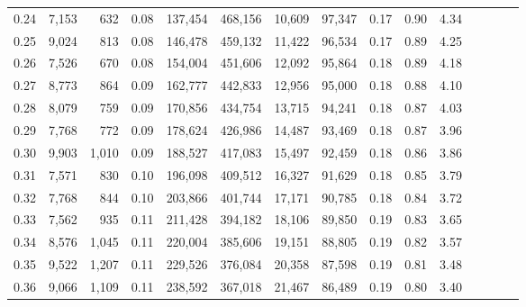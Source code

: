 \begin{tabular}{rrrcrrrrrrrrrrr}
0.24 &   7,153 &    632 &                                       0.08 &  137,454 &  468,156 &   10,609 &   97,347 &  0.17 &  0.90 &                         4.34 \\
0.25 &   9,024 &    813 &                                       0.08 &  146,478 &  459,132 &   11,422 &   96,534 &  0.17 &  0.89 &                         4.25 \\
0.26 &   7,526 &    670 &                                       0.08 &  154,004 &  451,606 &   12,092 &   95,864 &  0.18 &  0.89 &                         4.18 \\
0.27 &   8,773 &    864 &                                       0.09 &  162,777 &  442,833 &   12,956 &   95,000 &  0.18 &  0.88 &                         4.10 \\
0.28 &   8,079 &    759 &                                       0.09 &  170,856 &  434,754 &   13,715 &   94,241 &  0.18 &  0.87 &                         4.03 \\
0.29 &   7,768 &    772 &                                       0.09 &  178,624 &  426,986 &   14,487 &   93,469 &  0.18 &  0.87 &                         3.96 \\
0.30 &   9,903 &  1,010 &                                       0.09 &  188,527 &  417,083 &   15,497 &   92,459 &  0.18 &  0.86 &                         3.86 \\
0.31 &   7,571 &    830 &                                       0.10 &  196,098 &  409,512 &   16,327 &   91,629 &  0.18 &  0.85 &                         3.79 \\
0.32 &   7,768 &    844 &                                       0.10 &  203,866 &  401,744 &   17,171 &   90,785 &  0.18 &  0.84 &                         3.72 \\
0.33 &   7,562 &    935 &                                       0.11 &  211,428 &  394,182 &   18,106 &   89,850 &  0.19 &  0.83 &                         3.65 \\
0.34 &   8,576 &  1,045 &                                       0.11 &  220,004 &  385,606 &   19,151 &   88,805 &  0.19 &  0.82 &                         3.57 \\
0.35 &   9,522 &  1,207 &                                       0.11 &  229,526 &  376,084 &   20,358 &   87,598 &  0.19 &  0.81 &                         3.48 \\
0.36 &   9,066 &  1,109 &                                       0.11 &  238,592 &  367,018 &   21,467 &   86,489 &  0.19 &  0.80 &                         3.40 \\

\end{tabular}
